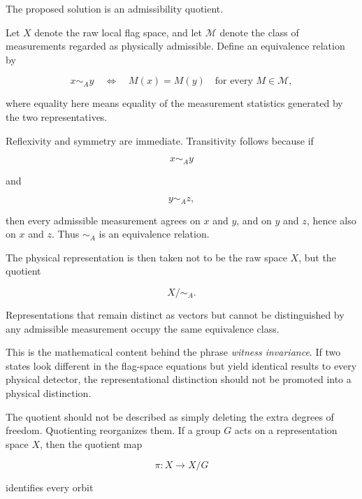\documentclass[11pt]{article}
\begin{document}
The proposed solution is an admissibility quotient.

Let $X$ denote the raw local flag space, and let $\mathcal M$ denote the class of measurements regarded as physically admissible. Define an equivalence relation by

\begin{equation}
x\sim_A y
\quad\Longleftrightarrow\quad
M(x)=M(y)
\quad
\text{for every }M\in\mathcal M,
\end{equation}

where equality here means equality of the measurement statistics generated by the two representatives.

Reflexivity and symmetry are immediate. Transitivity follows because if

\begin{equation}
x\sim_A y
\end{equation}

and

\begin{equation}
y\sim_A z,
\end{equation}

then every admissible measurement agrees on $x$ and $y$, and on $y$ and $z$, hence also on $x$ and $z$. Thus $\sim_A$ is an equivalence relation.

The physical representation is then taken not to be the raw space $X$, but the quotient

\begin{equation}
X/{\sim_A}.
\end{equation}

Representations that remain distinct as vectors but cannot be distinguished by any admissible measurement occupy the same equivalence class.

This is the mathematical content behind the phrase \emph{witness invariance}. If two states look different in the flag-space equations but yield identical results to every physical detector, the representational distinction should not be promoted into a physical distinction.

The quotient should not be described as simply deleting the extra degrees of freedom. Quotienting reorganizes them. If a group $G$ acts on a representation space $X$, then the quotient map

\begin{equation}
\pi:X\longrightarrow X/G
\end{equation}

identifies every orbit
\end{document}
